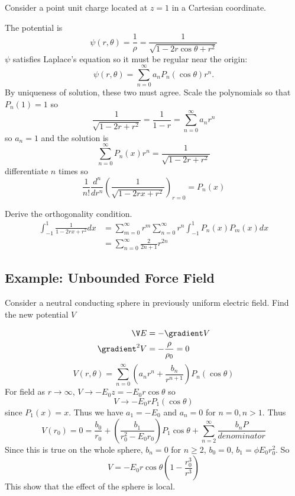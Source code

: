 \documentclass[a4paper]{article}
\newcommand*\grad{\gradient}
\newcommand*\laplace{\grad^2}
\newcommand*\lap{\laplace}
\begin{document}
Consider a point unit charge located at \(z = 1\) in a Cartesian coordinate.

The potential is
\[
  \psi(r, \theta) = \frac{1}{\rho} = \frac{1}{\sqrt{1 - 2r \cos \theta + r^2}}
\]
\(\psi\) satisfies Laplace's equation so it must be regular near the origin:
\[
  \psi(r, \theta) = \sum_{n = 0}^{\infty} a_n P_n(\cos \theta) r^n.
\]
By uniqueness of solution, these two must agree. Scale the polynomials so that \(P_n(1) = 1\) so
\[
  \frac{1}{\sqrt{1 - 2r + r^2}} = \frac{1}{1 - r} = \sum_{n = 0}^{\infty} a_n r^n
\]
so \(a_n = 1\) and the solution is
\[
  \sum_{n = 0}^{\infty} P_n(x)r^n = \frac{1}{\sqrt{1 - 2r + r^2}}
\]
differentiate \(n\) times so
\[
  \frac{1}{n!} \frac{d^n}{dr^n} \left( \frac{1}{\sqrt{1 - 2rx +r^2}} \right)_{r = 0} = P_n(x)
\]

\begin{ex}
  Derive the orthogonality condition.
  \begin{align*}
    \int_{-1}^{1} \frac{1}{1 - 2rx + r^2} dx &= \sum_{m = 0}^{\infty} r^m \sum_{n = 0}^{\infty} r^n \int_{-1}^{1} P_n(x)P_m(x) dx \\
                                             &= \sum_{n = 0}^{\infty} \frac{2}{2n + 1} r^{2n}
  \end{align*}
\end{ex}

\subsection{Example: Unbounded Force Field}

Consider a neutral conducting sphere in previously uniform electric field. Find the new potential \(V\)

\begin{align*}
  \V E &= -\grad V \\
  \lap V &= -\frac{\rho}{\rho_0} = 0
\end{align*}
\[
  V(r, \theta) = \sum_{n = 0}^{\infty}(a_n r^n + \frac{b_n}{r^{n + 1}}) P_n(\cos \theta)
\]
For field as \(r \to \infty\), \(V \to - E_0z = -E_0r \cos \theta\) so
\[
  V \to -E_0rP_1(\cos \theta)
\]
since \(P_1(x) = x\). Thus we have \(a_1 = - E_0\) and \(a_n = 0\) for \(n = 0, n > 1\). Thus
\[
  V(r_0) = 0 = \frac{b_0}{r_0} + \left( \frac{b_1}{r_0^2 - E_0r_0} \right) P_1 \cos \theta + \sum_{n = 2}^{\infty} \frac{b_nP}{denominator}
\]
Since this is true on the whole sphere, \(b_n = 0\) for \(n \geq 2\), \(b_0 = 0\), \(b_1 = \phi E_0 r_0^2\). So
\[
  V = -E_0 r \cos \theta \left( 1 - \frac{r_0^3}{r^3} \right)
\]
This show that the effect of the sphere is local.
\end{document}
